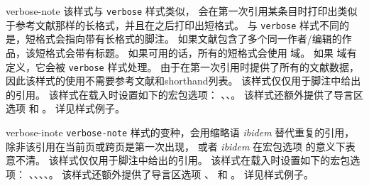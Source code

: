 \begin{marglist}
\item[verbose-note]
该样式与 \texttt{verbose} 样式类似，
会在第一次引用某条目时打印出类似于参考文献那样的长格式，并且在之后打印出短格式。
与 \texttt{verbose} 样式不同的是，短格式会指向带有长格式的脚注。
如果文献包含了多个同一作者/编辑的作品，该短格式会带有标题。
如果可用的话，所有的短格式会使用  域。
如果  域有定义，它会被 \texttt{verbose} 样式处理。
由于在第一次引用时提供了所有的文献数据，因此该样式的使用不需要参考文献和shorthand列表。
该样式仅仅用于脚注中给出的引用。
该样式在载入时设置如下的宏包选项：
、、。
该样式还额外提供了导言区选项  和 。
详见样式例子。

\item[verbose-inote]
\texttt{verbose-note} 样式的变种，会用缩略语 \emph{ibidem} 替代重复的引用，
除非该引用在当前页或跨页是第一次出现，
或者 \emph{ibidem} 在宏包选项  的意义下表意不清。
该样式仅仅用于脚注中给出的引用。
该样式在载入时设置如下的宏包选项：
、、、、。
该样式还额外提供了导言区选项 、 和 。
详见样式例子。


\end{marglist}
